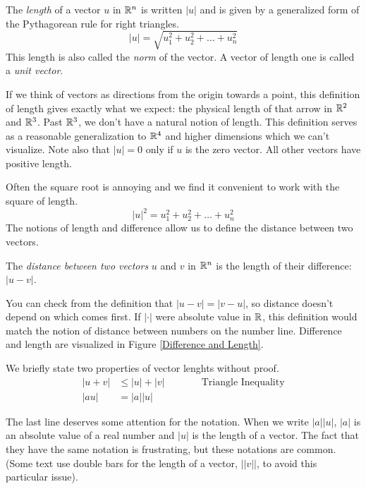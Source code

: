 \documentclass[fleqn]{report}
\begin{document}
\begin{defn}
The \emph{length} of a vector $u$ in
$\mathbb{R}^n$ is written $|u|$ and is given by a generalized form of
the Pythagorean rule for right triangles.
\begin{equation*}
|u| = \sqrt{u_1^2 + u_2^2 + \ldots + u_n^2}
\end{equation*}
This length is also called the \emph{norm} of the vector.
A vector of length one is called a \emph{unit vector}.
\end{defn}

If we think of vectors as directions from the origin towards a
point, this definition of length gives exactly what we expect:
the physical length of that arrow in $\mathbb{R}^2$ and $\mathbb{R}^3$.
Past $\mathbb{R}^3$, we don't have a natural notion of length. This
definition serves as a reasonable generalization
to $\mathbb{R}^4$ and higher dimensions which we can't
visualize. Note also that $|u| = 0$ only if $u$ is the zero
vector. All other vectors have positive length.

Often the square root is annoying and we find it convenient to
work with the square of length. 
\begin{equation*}
|u|^2 = u_1^2 + u_2^2 + \ldots + u_n^2
\end{equation*}
The notions of length and difference allow us to define the distance
between two vectors.

\begin{defn}
The \emph{distance between two vectors} $u$ and $v$ in $\mathbb{R}^n$
is the length of their difference: $|u-v|$.
\end{defn}

You can check from the definition that $|u-v| = |v-u|$, so
distance doesn't depend on which comes first. If $|\cdot|$ were
absolute value in $\mathbb{R}$, this definition would match the notion
of distance between numbers on the number line. 
Difference and length are visualized in Figure \ref{Difference
and Length}. 

\begin{prop}
We briefly state two properties of vector lenghts without proof.
\begin{align*}
|u+v| & \leq |u| + |v| & \hspace{1cm} \ \text{ Triangle Inequality} \\
|au| & = |a||u| & 
\end{align*}
\end{prop}

The last line deserves some attention for the notation. When
we write $|a| |u|$, $|a|$ is an absolute value of a
real number and $|u|$ is the length of a vector. The fact
that they have the same notation is frustrating, but these
notations are common. (Some text use double bars for the
length of a vector, $||v||$, to avoid this particular issue). 
\end{document}
